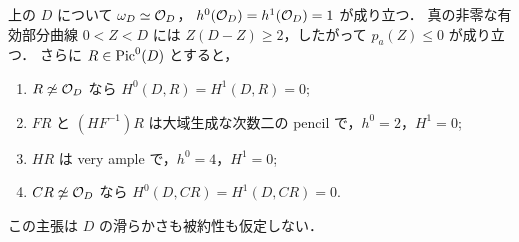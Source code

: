 \begin{lemma}
\label{lem:qa-core-curve-vanishing}
上の $D$ について
$\omega_D\simeq\mathcal O_D$，
$h^0(\mathcal O_D)=h^1(\mathcal O_D)=1$ が成り立つ．
真の非零な有効部分曲線 $0<Z<D$ には
$Z(D-Z)\ge2$，したがって $p_a(Z)\le0$ が成り立つ．
さらに $R\in\operatorname{Pic}^0(D)$ とすると，
\begin{enumerate}
\item $R\not\simeq\mathcal O_D$ なら $H^0(D,R)=H^1(D,R)=0$;
\item $FR$ と $(H F^{-1})R$ は大域生成な次数二の
      pencil で，$h^0=2$，$H^1=0$;
\item $HR$ は very ample で，$h^0=4$，$H^1=0$;
\item $CR\not\simeq\mathcal O_D$ なら $H^0(D,CR)=H^1(D,CR)=0$.
\end{enumerate}
この主張は $D$ の滑らかさも被約性も仮定しない．
\end{lemma}
